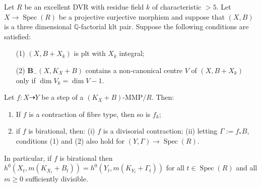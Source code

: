 \documentclass[a4paper,12pt]{book}
\DeclareMathOperator{\Spec}{Spec}
\newcommand{\bQ}{\mathbb{Q}}
\begin{document}
	\begin{proposition}\label{lemma:MMP_in_fam2}
		Let $R$ be an excellent DVR with residue field $k$ of characteristic $>5$. Let $X \to \Spec(R)$ be a projective surjective morphism and suppose that $(X,B)$ is a three dimensional $\bQ$-factorial klt pair.
		Suppose the following conditions are satisfied:
		\begin{itemize}
		\item[(1)] $(X,B+X_k)$ is plt with $X_k$ integral;
		\item[(2)] ${\mathbf{B}_{-}(X, K_{X}+B)}$ contains a non-canonical centre $V$ of $(X,B+X_{k})$ only if $\dim V_{k}=\dim V -1$.
		\end{itemize}
		Let $f \colon X\dashrightarrow Y$ be a step of a $(K_X+B)$-MMP$/R$. Then:
		\begin{enumerate}
			\item  If $f$ is a contraction of fibre type, then so is $f_k$;
			\item if $f$ is birational, then:
			\subitem(i) $f$ is a divisorial contraction;
			\subitem(ii) letting $\Gamma:=f_\ast B$, conditions (1) and (2) also hold for $(Y,\Gamma)\to\Spec (R)$.
		\end{enumerate} 
		In particular, if $f$ is birational then $h^0(X_t,m(K_{X_t}+B_t))=h^0(Y_t,m(K_{Y_t}+\Gamma_t))$ for all $t\in\Spec (R)$ and all $m\geq 0$ sufficiently divisible.
	\end{proposition}
	
\end{document}
